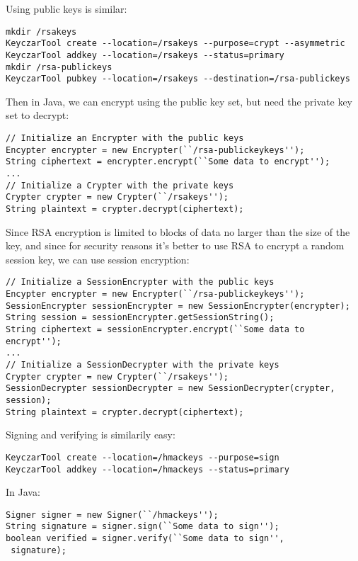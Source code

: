 \documentclass{llncs}
\begin{document}
Using public keys is similar:

\begin{verbatim}
mkdir /rsakeys
KeyczarTool create --location=/rsakeys --purpose=crypt --asymmetric
KeyczarTool addkey --location=/rsakeys --status=primary
mkdir /rsa-publickeys
KeyczarTool pubkey --location=/rsakeys --destination=/rsa-publickeys
\end{verbatim}

Then in Java, we can encrypt using the public key set, but need the
private key set to decrypt:

\begin{verbatim}
// Initialize an Encrypter with the public keys
Encypter encrypter = new Encrypter(``/rsa-publickeykeys'');
String ciphertext = encrypter.encrypt(``Some data to encrypt'');
...
// Initialize a Crypter with the private keys
Crypter crypter = new Crypter(``/rsakeys'');
String plaintext = crypter.decrypt(ciphertext);
\end{verbatim}

Since RSA encryption is limited to blocks of data no larger than the
size of the key, and since for security reasons it's better to use RSA
to encrypt a random session key, we can use session encryption:

\begin{verbatim}
// Initialize a SessionEncrypter with the public keys
Encypter encrypter = new Encrypter(``/rsa-publickeykeys'');
SessionEncrypter sessionEncrypter = new SessionEncrypter(encrypter);
String session = sessionEncrypter.getSessionString();
String ciphertext = sessionEncrypter.encrypt(``Some data to encrypt'');
...
// Initialize a SessionDecrypter with the private keys
Crypter crypter = new Crypter(``/rsakeys'');
SessionDecrypter sessionDecrypter = new SessionDecrypter(crypter, session);
String plaintext = crypter.decrypt(ciphertext);
\end{verbatim}

Signing and verifying is similarily easy:
\begin{verbatim}
KeyczarTool create --location=/hmackeys --purpose=sign
KeyczarTool addkey --location=/hmackeys --status=primary
\end{verbatim}

In Java:
\begin{verbatim}
Signer signer = new Signer(``/hmackeys'');
String signature = signer.sign(``Some data to sign'');
boolean verified = signer.verify(``Some data to sign'',
 signature);
\end{verbatim}
\end{document}
